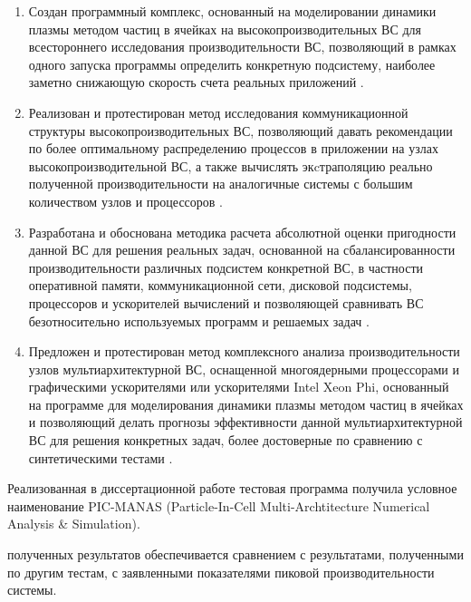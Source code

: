 {}
\begin{enumerate}
	\item Создан программный комплекс, основанный на моделировании динамики плазмы методом частиц в ячейках на высокопроизводительных ВС для всестороннего исследования производительности ВС, позволяющий в рамках одного запуска программы определить конкретную подсистему, наиболее заметно снижающую скорость счета реальных приложений \cite{LotovPoP,MatMod,VychMetPlasma,VestnikNNSU,adaptCPC}. 
	
	\item Реализован и протестирован метод исследования коммуникационной структуры высокопроизводительных ВС, позволяющий давать рекомендации по более оптимальному распределению процессов в приложении на узлах высокопроизводительной ВС, а также вычислять экcтраполяцию реально полученной производительности на аналогичные системы с большим количеством узлов и процессоров \cite{VestnikNSUadapt,VestnikNNSU}.
	
	\item Разработана и обоснована методика расчета абсолютной оценки пригодности данной ВС для решения реальных задач, основанной на сбалансированности производительности различных подсистем конкретной ВС, в частности оперативной памяти, коммуникационной сети, дисковой подсистемы, процессоров и ускорителей вычислений и позволяющей сравнивать ВС безотносительно используемых программ и решаемых задач \cite{multigridAuto,VestnikNNSU,SuperFrI,astroCoDesign,integrApproach,NumMethMultiLevel}. 
	
	\item Предложен и протестирован метод комплексного анализа производительности узлов мультиархитектурной ВС, оснащенной многоядерными процессорами и графическими ускорителями или ускорителями Intel Xeon Phi, основанный на программе для моделирования динамики плазмы методом частиц в ячейках и позволяющий делать прогнозы эффективности данной мультиархитектурной ВС для решения конкретных задач, более достоверные по сравнению с синтетическими тестами  \cite{MohographyTarkov,VestnikNSU3D,MatMod,VychMethProgExa}.
\end{enumerate}

Реализованная в диссертационной работе тестовая программа получила условное наименование 
PIC-MANAS (Particle-In-Cell Multi-Archtitecture Numerical Analysis \& Simulation).


{\reliability}  полученных результатов обеспечивается сравнением с результатами, полученными по другим тестам, с заявленными показателями пиковой производительности системы.


